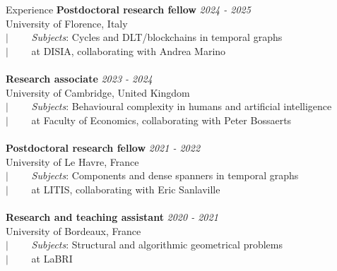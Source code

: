 \documentclass[french]{resume} %
\begin{document}
	\begin{rSection}{Experience}
		{\bf Postdoctoral research fellow} \hfill {\em 2024 - 2025} 
		\\ University of Florence, Italy
		\\ $| \qquad$ \textit{Subjects}: Cycles and DLT/blockchains in temporal graphs
		\\ $| \qquad$ at DISIA, collaborating with Andrea Marino 
		\\
		\\{\bf Research associate} \hfill {\em 2023 - 2024} 
		\\ University of Cambridge, United Kingdom
		\\ $| \qquad$ \textit{Subjects}: Behavioural complexity in humans and artificial intelligence
		\\ $| \qquad$ at Faculty of Economics, collaborating with Peter Bossaerts
		\\
		\\ {\bf Postdoctoral research fellow} \hfill {\em 2021 - 2022} 
		\\ University of Le Havre, France
		\\ $| \qquad$ \textit{Subjects}: Components and dense spanners in temporal graphs
		\\ $| \qquad$ at LITIS, collaborating with Eric Sanlaville
		\\
		\\ {\bf Research and teaching assistant} \hfill {\em 2020 - 2021} 
		\\ University of Bordeaux, France
		\\ $| \qquad$ \textit{Subjects}: Structural and algorithmic geometrical problems
		\\ $| \qquad$ at LaBRI
	\end{rSection}
	
\end{document}

